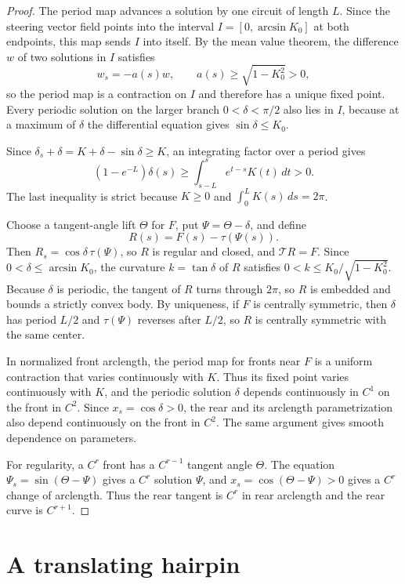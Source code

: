 \documentclass[11pt]{article}
\numberwithin{equation}{section}
\newcommand{\Tmap}{\mathcal T}
\begin{document}
\begin{proof}
The period map advances a solution by one circuit of length \(L\). Since the
steering vector field points into the interval \(I=[0,\arcsin K_0]\) at both
endpoints, this map sends \(I\) into itself. By the mean value theorem, the
difference \(w\) of two solutions in \(I\) satisfies
\[
  w_s=-a(s)w,\qquad a(s)\geq\sqrt{1-K_0^2}>0,
\]
so the period map is a contraction on \(I\) and therefore has a unique fixed
point. Every periodic solution on the larger branch \(0<\delta<\pi/2\) also
lies in \(I\), because at a maximum of \(\delta\) the differential equation
gives \(\sin\delta\leq K_0\).

Since \(\delta_s+\delta=K+\delta-\sin\delta\geq K\), an integrating factor
over a period gives
\[
  (1-e^{-L})\delta(s)
  \geq\int_{s-L}^{s}e^{t-s}K(t)\,dt>0.
\]
The last inequality is strict because \(K\geq0\) and
\(\int_0^L K(s)\,ds=2\pi\).

Choose a tangent-angle lift \(\Theta\) for \(F\), put
\(\Psi=\Theta-\delta\), and define
\[
  R(s)=F(s)-\tau(\Psi(s)).
\]
Then \(R_s=\cos\delta\,\tau(\Psi)\), so \(R\) is regular and closed, and
\(\Tmap R=F\). Since \(0<\delta\leq\arcsin K_0\), the curvature
\(k=\tan\delta\) of \(R\) satisfies \(0<k\leq K_0/\sqrt{1-K_0^2}\). Because
\(\delta\) is periodic, the tangent of \(R\) turns through \(2\pi\), so \(R\)
is embedded and bounds a strictly convex body. By uniqueness, if \(F\) is
centrally symmetric, then \(\delta\) has period \(L/2\) and \(\tau(\Psi)\)
reverses after \(L/2\), so \(R\) is centrally symmetric with the same center.

In normalized front arclength, the period map for fronts near \(F\) is a
uniform contraction that varies continuously with \(K\). Thus its fixed point
varies continuously with \(K\), and the periodic solution \(\delta\) depends
continuously in \(C^1\) on the front in \(C^2\). Since \(x_s=\cos\delta>0\),
the rear and its arclength parametrization also depend continuously on the
front in \(C^2\). The same argument gives smooth dependence on parameters.

For regularity, a \(C^r\) front has a \(C^{r-1}\) tangent angle \(\Theta\).
The equation \(\Psi_s=\sin(\Theta-\Psi)\) gives a \(C^r\) solution \(\Psi\),
and \(x_s=\cos(\Theta-\Psi)>0\) gives a \(C^r\) change of arclength. Thus
the rear tangent is \(C^r\) in rear arclength and the rear curve is
\(C^{r+1}\).
\end{proof}

\section{A translating hairpin}\label{sec:translator}
\end{document}
